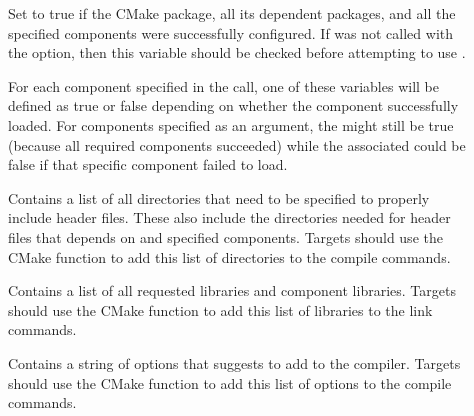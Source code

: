 \begin{description}
\item[]
  Set to true if the \VTKm CMake package, all its dependent packages, and all the specified components were successfully configured.
  If  was not called with the  option, then this variable should be checked before attempting to use \VTKm.
\item[]
  For each component specified in the  call, one of these variables will be defined as true or false depending on whether the component successfully loaded.
  For components specified as an  argument, the  might still be true (because all required components succeeded) while the associated  could be false if that specific component failed to load.
\item[]
  Contains a list of all directories that need to be specified to properly include \VTKm header files.
  These also include the directories needed for header files that \VTKm depends on and specified components.
  Targets should use the  CMake function to add this list of directories to the compile commands.
\item[]
  Contains a list of all requested \VTKm libraries and component libraries.
  Targets should use the  CMake function to add this list of libraries to the link commands.
\item[]
  Contains a string of options that \VTKm suggests to add to the compiler.
  Targets should use the  CMake function to add this list of options to the compile commands.
\end{description}


